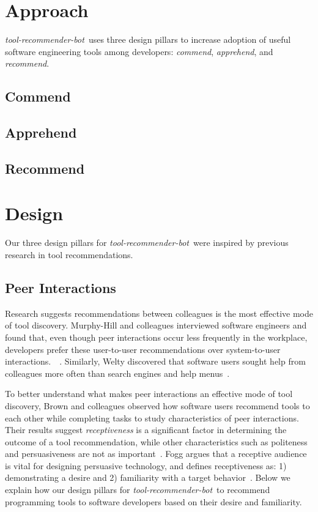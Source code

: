 \documentclass[sigconf,review,anonymous]{acmart}
\newcommand{\tool}{\textsl{tool-recommender-bot}}
\begin{document}
\section{Approach}

\tool~uses three design pillars to increase adoption of useful software engineering tools among developers: \textit{commend}, \textit{apprehend}, and \textit{recommend}.

\subsection{Commend}

\subsection{Apprehend}

\subsection{Recommend}

\section{Design}

Our three design pillars for \tool~were inspired by previous research in tool recommendations.

\subsection{Peer Interactions}

Research suggests recommendations between colleagues is the most effective mode of tool discovery. Murphy-Hill and colleagues interviewed software engineers and found that, even though peer interactions occur less frequently in the workplace, developers prefer these user-to-user recommendations over system-to-user interactions.~\cite{MurphyHill2011PeerInteraction}~\cite{Murphy-Hill2015HowDoUsers}. Similarly, Welty discovered that software users sought help from colleagues more often than search engines and help menus~\cite{Welty2011Help}. 

To better understand what makes peer interactions an effective mode of tool discovery, Brown and colleagues observed how software users recommend tools to each other while completing tasks to study characteristics of peer interactions. Their results suggest \emph{receptiveness} is a significant factor in determining the outcome of a tool recommendation, while other characteristics such as politeness and persuasiveness are not as important~\cite{vlhcc17}. Fogg argues that a receptive audience is vital for designing persuasive technology, and defines receptiveness as: 1) demonstrating a desire and 2) familiarity with a target behavior~\cite{FoggPersuasive}. Below we explain how our design pillars for \tool~to recommend programming tools to software developers based on their desire and familiarity.
\end{document}
